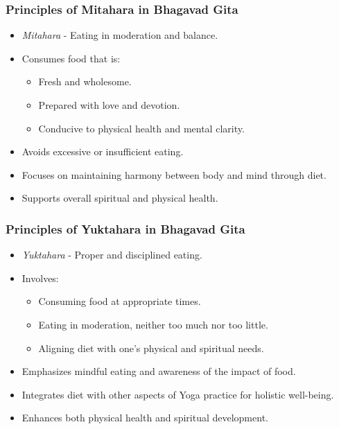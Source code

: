 \begin{frame}[fragile]\frametitle{Principles of Mitahara in Bhagavad Gita}

      \begin{itemize}
		\item \textit{Mitahara} - Eating in moderation and balance.
		\item Consumes food that is:
		  \begin{itemize}
		      \item Fresh and wholesome.
		      \item Prepared with love and devotion.
		      \item Conducive to physical health and mental clarity.
		  \end{itemize}
		\item Avoids excessive or insufficient eating.
		\item Focuses on maintaining harmony between body and mind through diet.
		\item Supports overall spiritual and physical health.
	  \end{itemize}

\end{frame}

\begin{frame}[fragile]\frametitle{Principles of Yuktahara in Bhagavad Gita}

      \begin{itemize}
		\item \textit{Yuktahara} - Proper and disciplined eating.
		\item Involves:
		  \begin{itemize}
		      \item Consuming food at appropriate times.
		      \item Eating in moderation, neither too much nor too little.
		      \item Aligning diet with one's physical and spiritual needs.
		  \end{itemize}
		\item Emphasizes mindful eating and awareness of the impact of food.
		\item Integrates diet with other aspects of Yoga practice for holistic well-being.
		\item Enhances both physical health and spiritual development.
	  \end{itemize}

\end{frame}



